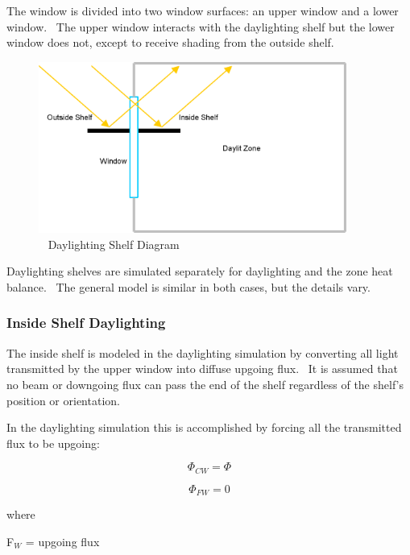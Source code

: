 The window is divided into two window surfaces: an upper window and a lower window.~ The upper window interacts with the daylighting shelf but the lower window does not, except to receive shading from the outside shelf.

\begin{figure}[hbtp] %
\centering
\includegraphics[width=0.9\textwidth, height=0.9\textheight, keepaspectratio=true]{media/image893.png}
\caption{  Daylighting Shelf Diagram \protect \label{fig:daylighting-shelf-diagram}}
\end{figure}

Daylighting shelves are simulated separately for daylighting and the zone heat balance.~ The general model is similar in both cases, but the details vary.

\subsubsection{Inside Shelf Daylighting}\label{inside-shelf-daylighting}

The inside shelf is modeled in the daylighting simulation by converting all light transmitted by the upper window into diffuse upgoing flux.~ It is assumed that no beam or downgoing flux can pass the end of the shelf regardless of the shelf's position or orientation.

In the daylighting simulation this is accomplished by forcing all the transmitted flux to be upgoing:

\begin{equation}
{\Phi_{CW}} = \Phi
\end{equation}

\begin{equation}
{\Phi_{FW}} = 0
\end{equation}

where

F\(_{W}\) = upgoing flux

